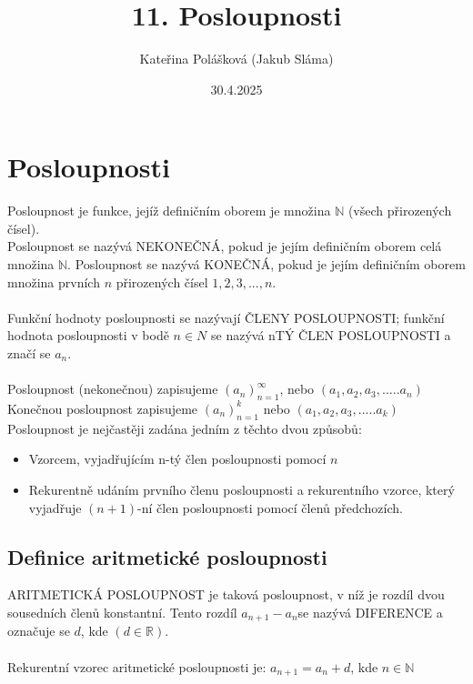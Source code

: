 \title{11. Posloupnosti}
\author{Kateřina Polášková (Jakub Sláma)}
\date{30.4.2025}

\maketitle

\section{Posloupnosti}
Posloupnost je funkce, jejíž definičním oborem je množina $\mathbb{N}$ (všech přirozených čísel). \\
Posloupnost se nazývá NEKONEČNÁ, pokud je jejím definičním oborem celá množina $\mathbb{N}$.
Posloupnost se nazývá KONEČNÁ, pokud je jejím definičním oborem množina prvních $n$ přirozených čísel ${1, 2, 3, ..., n}$. \\ \\

Funkční hodnoty posloupnosti se nazývají ČLENY POSLOUPNOSTI; funkční hodnota
posloupnosti v bodě $n \in N$ se nazývá nTÝ ČLEN POSLOUPNOSTI a značí se $a_n$. \\ \\

Posloupnost (nekonečnou) zapisujeme $(a_n)^\infty_ {n=1}$, nebo $(a_1,a_2,a_3,.....a_n)$ \\
Konečnou posloupnost zapisujeme $(a_n)^k_{n=1}$ nebo $(a_1,a_2,a_3,.....a_k)$\\
Posloupnost je nejčastěji zadána jedním z těchto dvou způsobů:
\begin{itemize}
    \item Vzorcem, vyjadřujícím n-tý člen posloupnosti pomocí $n$
    \item Rekurentně udáním prvního členu posloupnosti a rekurentního vzorce, který
vyjadřuje $(n + 1)$-ní člen posloupnosti pomocí členů předchozích.
\end{itemize}

\subsection{Definice aritmetické posloupnosti}
ARITMETICKÁ POSLOUPNOST je taková posloupnost, v níž je rozdíl dvou sousedních členů
konstantní. Tento rozdíl $a_{n+1} -a_n $se nazývá DIFERENCE a označuje se $d$, kde $(d \in \mathbb{R})$. \\ \\

Rekurentní vzorec aritmetické posloupnosti je: $a_{n+1}=a_n+d$, kde $n \in \mathbb{N}$\\ \\

